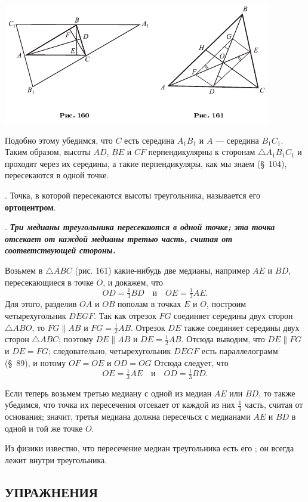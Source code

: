 \documentclass[oneside]{book}
\begin{document}
\includegraphics{pics/ris-160-161}

Подобно этому убедимся, что $C$ есть середина $A_1B_1$ и $A$ — середина $B_1C_1$.
Таким образом, высоты $AD$, $BE$ и $CF$ перпендикулярны к сторонам $\triangle A_1B_1C_1$ и проходят через их середины, а такие перпендикуляры, как мы знаем (§~104), пересекаются в одной точке.

.
Точка, в которой пересекаются высоты треугольника, называется его \textbf{ортоцентром}.

.
\textbf{\emph{Три медианы треугольника пересекаются в одной точке;
эта точка отсекает от каждой медианы третью часть, считая от соответствующей стороны.}}

Возьмем в $\triangle ABC$ (рис. 161) какие-нибудь две медианы, например $AE$ и $BD$, пересекающиеся в точке $O$, и докажем, что
\[OD=\tfrac13 BD\quad\text{и}\quad OE = \tfrac13 AE.\]
Для этого, разделив $OA$ и $OB$ пополам в точках $E$ и $O$, построим четырехугольник $DEGF$.
Так как отрезок $FG$ соединяет середины двух сторон $\triangle ABO$, то $FG\parallel AB$ и $FG=\tfrac12 AB$.
Отрезок $DE$ также соединяет середины двух сторон $\triangle ABC$;
поэтому $DE\parallel AB$ и $DE=\tfrac12 AB$.
Отсюда выводим, что $DE \parallel FG$ и $DE=FG$;
следовательно, четырехугольник $DEGF$ есть параллелограмм (§~89), и потому $OF=OE$ и $OD=OG$ Отсюда следует, что
\[ OE=\tfrac13AE\quad\text{и}\quad OD=\tfrac13 BD.\]

Если теперь возьмем третью медиану с одной из медиан $AE$ или $BD$, то также убедимся, что точка их пересечения отсекает от каждой из них $\tfrac13$ часть, считая от основания;
значит, третья медиана должна пересечься с медианами $AE$ и $BD$ в одной и той же точке $O$.

Из физики известно, что пересечение медиан треугольника есть его ;
он всегда лежит внутри треугольника.


\subsection*{УПРАЖНЕНИЯ}
\end{document}
